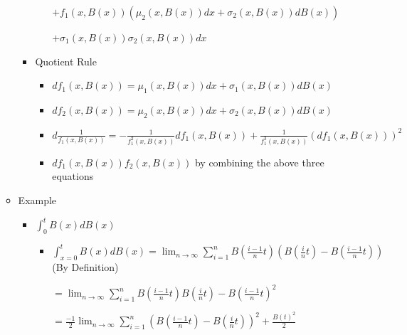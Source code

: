 \documentclass[a4paper]{article}
\begin{document}
\begin{itemize}
\begin{itemize}
\begin{itemize}
\begin{itemize}
                                $+ f_1(x, B(x)) (\mu_2(x, B(x)) dx + \sigma_2(x, B(x)) d B(x))$

                                $+ \sigma_1(x, B(x))\sigma_2(x, B(x))dx$
                        \end{itemize}
                    \item Quotient Rule
                        \begin{itemize}
                            \item $d f_1(x, B(x)) = \mu_1(x, B(x)) dx + \sigma_1(x, B(x)) d B(x)$
                            \item $d f_2(x, B(x)) = \mu_2(x, B(x)) dx + \sigma_2(x, B(x)) d B(x)$
                            \item $d\frac{1}{f_1(x, B(x))} = - \frac{1}{f_1^2(x, B(x))} df_1(x, B(x)) + \frac{1}{f_1^3(x, B(x))} (df_1(x, B(x)))^2$
                            \item $df_1(x, B(x)) f_2(x, B(x))$ by combining the above three equations
                        \end{itemize}
                \end{itemize}
            \item Example
                \begin{itemize}
                    \item $\int_0^t B(x) d B(x)$
                        \begin{itemize}
                            \item $\int_{x=0}^t B(x) dB(x) = \lim_{n \rightarrow \infty} \sum_{i=1}^n B(\frac{i-1}{n}t) (B(\frac{i}{n}t) - B(\frac{i-1}{n}t))$ (By Definition)

                            $= \lim_{n \rightarrow \infty} \sum_{i=1}^n B(\frac{i-1}{n}t) B(\frac{i}{n}t) - B(\frac{i-1}{n}t)^2$

                            $= \frac{-1}{2} \lim_{n \rightarrow \infty} \sum_{i=1}^n (B(\frac{i-1}{n}t) - B(\frac{i}{n}t))^2 + \frac{B(t)^2}{2}$


\end{itemize}
\end{itemize}
\end{itemize}
\end{itemize}
\end{document}
